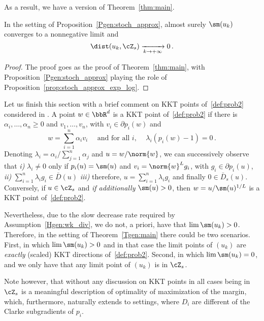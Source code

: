 As a result, we have a version of Theorem~\ref{thm:main}.
\begin{theorem}\label{Tgen:main}
  In the setting of Proposition~\ref{Pgen:stoch_approx}, almost surely $\sm(u_k)$ converges to a nonnegative limit and 
  \begin{equation}\label{Egen:conv_uk}
    \dist(u_k, \cZ_s) \xrightarrow[k \rightarrow + \infty]{} 0 \, .
  \end{equation}
\end{theorem}
\begin{proof}
  The proof goes as the proof of Theorem~\ref{thm:main}, with Proposition~\ref{Pgen:stoch_approx} playing the role of Proposition~\ref{prop:stoch_approx_exp_log}.
\end{proof}

Let us finish this section with a brief comment on KKT points of~\eqref{def:prob2} considered in \cite{Lyu_Li_maxmargin}.
A point $w \in \bbR^d$ is a KKT point of~\eqref{def:prob2} if there is $\alpha_i, \ldots, \alpha_n \geq 0$ and $v_1, \ldots, v_n$, with $v_i \in \partial p_i(w)$ and 
\begin{equation*}
  w = \sum_{i=1}^n \alpha_i v_i \quad \textrm{ and for all $i$, } \quad \lambda_i(p_i(w)- 1) = 0 \, .
\end{equation*}
Denoting $\lambda_i = \alpha_i/ \sum_{j=1}^n \alpha_j$ and $u = w/ \norm{w}$, we can successively observe that \emph{i)} $\lambda_i \neq 0$ only if $p_i(u) = \sm(u)$ and $v_i = \norm{w}^L g_i$, with $g_i \in\partial p_i(u)$, \emph{ii)} $\sum_{i=1}^n \lambda_i g_i \in \bar{D}(u)$ \emph{iii)} therefore, $u= \sum_{i=1}^n \lambda_i g_i$ and finally $0\in \bar{D}_s(u)$. 
Conversely, if $u \in \cZ_s$ and \emph{if additionally} $\sm(u) >0$, then $w = u/\sm(u)^{1/L}$ is a KKT point of~\eqref{def:prob2}.

Nevertheless, due to the slow decrease rate required by Assumption~\ref{Hgen:wk_div}, we do not, a priori, have that $\lim \sm(u_k) > 0$. Therefore, in the setting of Theorem~\ref{Tgen:main} there could be two scenarios. First, in which $\lim \sm(u_k) >0$ and in that case the limit points of $(u_k)$ are \emph{exactly} (scaled) KKT directions of~\eqref{def:prob2}. Second, in which $\lim \sm(u_k) =0$, and we only have that any limit point of $(u_k)$ is in $\cZ_s$.

Note however, that without any discussion on KKT points in all cases being in $\cZ_s$ is a meaningful description of optimality of maximization of the margin, which, furthermore, naturally extends to settings, where $D_i$ are different of the Clarke subgradients of $p_i$.


